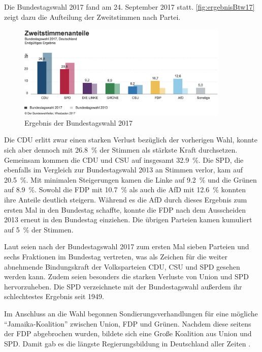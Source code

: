 Die Bundestagswahl \num{2017} fand am \num{24}. September \num{2017} statt. \autoref{fig:ergebnisBtw17} zeigt dazu die Aufteilung der Zweitstimmen nach Partei.

\begin{figure}[H]
    \centering
    \includegraphics[width=0.9\textwidth]{data/images/ergebnisBtw17.png}
    \caption{Ergebnis der Bundestagswahl \num{2017} \autocite{noauthor_bundestagswahl_nodate}} \label{fig:ergebnisBtw17}
\end{figure}

Die \ac{CDU} erlitt zwar einen starken Verlust bezüglich der vorherigen Wahl, konnte sich aber dennoch mit \SI{26.8}{\percent} der Stimmen als stärkste Kraft durchsetzen. Gemeinsam kommen die \ac{CDU} und \acs{CSU} auf insgesamt \SI{32.9}{\percent}. Die \ac{SPD}, die ebenfalls im Vergleich zur Bundestagswahl \num{2013} an Stimmen verlor, kam auf \SI{20.5}{\percent}. Mit minimalen Steigerungen kamen die Linke auf \SI{9.2}{\percent} und die Grünen auf \SI{8.9}{\percent}. Sowohl die \ac{FDP} mit \SI{10.7}{\percent} als auch die \ac{AfD} mit \SI{12.6}{\percent} konnten ihre Anteile deutlich steigern. Während es die \ac{AfD} durch dieses Ergebnis zum ersten Mal in den Bundestag schaffte, konnte die \ac{FDP} nach dem Ausscheiden \num{2013} erneut in den Bundestag einziehen. Die übrigen Parteien kamen kumuliert auf \SI{5}{\percent} der Stimmen.

Laut \textcite{schmid_deutscher_2021} seien nach der Bundestagswahl \num{2017} zum ersten Mal sieben Parteien und sechs Fraktionen im Bundestag vertreten, was als Zeichen für die weiter abnehmende Bindungskraft der Volksparteien \ac{CDU}, \ac{CSU} und \ac{SPD} gesehen werden kann. Zudem seien besonders die starken Verluste von Union und \ac{SPD} hervorzuheben. Die \ac{SPD} verzeichnete mit der Bundestagswahl außerdem ihr schlechtestes Ergebnis seit \num{1949}.

Im Anschluss an die Wahl begonnen Sondierungsverhandlungen für eine mögliche \enquote{Jamaika-Koalition} zwischen Union, \ac{FDP} und Grünen. Nachdem diese seitens der \ac{FDP} abgebrochen wurden, bildete sich eine Große Koalition aus Union und \ac{SPD}. Damit gab es die längste Regierungsbildung in Deutschland aller Zeiten \parencite{schmid_deutscher_2021}.

